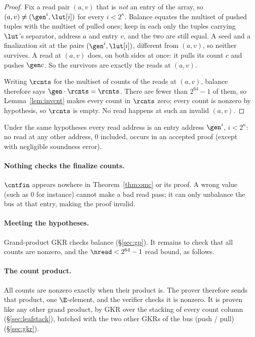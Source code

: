 \begin{proof}
Fix a read pair $(a,v)$ that is \emph{not} an entry of the array, so $(a,v)\neq(\gen^{i},\lut[i])$ for every $i<2^{\kappa}$. Balance equates the multiset of pushed tuples with the multiset of pulled ones; keep in each only the tuples carrying $\lut$'s separator, address $a$ and entry $v$, and the two are still equal. A seed and a finalization sit at the pairs $(\gen^{i},\lut[i])$, different from $(a,v)$, so neither survives. A read at $(a,v)$ does, on both sides at once: it pulls its count $c$ and pushes $\gen c$. So the survivors are exactly the reads at $(a,v)$.

Writing $\rcnts$ for the multiset of counts of the reads at $(a,v)$, balance therefore says $\gen\cdot\rcnts=\rcnts$. There are fewer than $2^{64}-1$ of them, so Lemma~\ref{lem:invcnt} makes every count in $\rcnts$ zero; every count is nonzero by hypothesis, so $\rcnts$ is empty. No read happens at such an invalid $(a,v)$.

\end{proof}

\begin{corollary}\label{cor:addrrange}
Under the same hypotheses every read address is an entry address $\gen^{i}$, $i<2^{\kappa}$: no read at any other address, $0$ included, occurs in an accepted proof (except with negligible soundness error).
\end{corollary}

\paragraph{Nothing checks the finalize counts.} $\cntfin$ appears nowhere in Theorem~\ref{thm:omc} or its proof. A wrong value (such as $0$ for instance) cannot make a bad read pass; it can only unbalance the bus at that entry, making the proof invalid.

\paragraph{Meeting the hypotheses.} Grand-product GKR checks balance (\S\ref{sec:gp}). It remains to check that all counts are nonzero, and the $\nread<2^{64}-1$ read bound, as follows.

\paragraph{The count product.} All counts are nonzero exactly when their product is. The prover therefore sends that product, one $\E$-element, and the verifier checks it is nonzero. It is proven like any other grand product, by GKR over the stacking of every count column (\S\ref{sec:leafstack}), batched with the two other GKRs of the bus (push / pull) (\S\ref{sec:gkr}).

